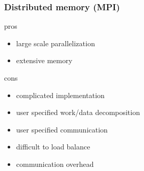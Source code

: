\documentclass[mathserif]{beamer}
\begin{document}
\begin{frame}
    \frametitle{Distributed memory (MPI)}
    \begin{minipage}[b]{0.45\linewidth}
	pros
	\begin{itemize}
	    \item large scale parallelization
	    \item extensive memory
	\end{itemize}
	cons
	\begin{itemize}
	    \item complicated implementation
	    \item user specified work/data decomposition 
	    \item user specified communication
	    \item difficult to load balance
	    \item communication overhead
	\end{itemize}
    \end{minipage}
    \hfill
    \begin{minipage}[b]{0.4\linewidth}
\end{minipage}
\end{frame}
\end{document}
